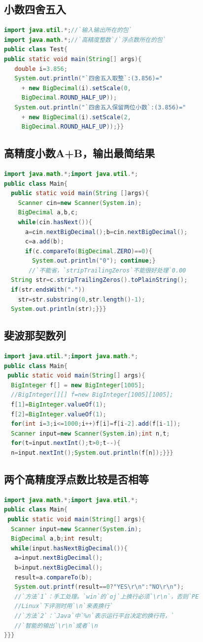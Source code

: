 \documentclass[UTF8,a4paper,titlepage]{ctexart}
\begin{document}
        \subsection{小数四舍五入}
\begin{lstlisting}[language=Java]
import java.util.*;//`输入输出所在的包`
import java.math.*;//`高精度整数`/`浮点数所在的包`
public class Test{
public static void main(String[] args){
   double i=3.856;
   System.out.println("`四舍五入取整`:(3.856)="
     + new BigDecimal(i).setScale(0,
     BigDecimal.ROUND_HALF_UP));
   System.out.println("`四舍五入保留两位小数`:(3.856)="
     + new BigDecimal(i).setScale(2,
     BigDecimal.ROUND_HALF_UP));}}
\end{lstlisting}
        \subsection{高精度小数A+B，输出最简结果}
\begin{lstlisting}[language=Java]
import java.math.*;import java.util.*;
public class Main{
  public static void main(String []args){
    Scanner cin=new Scanner(System.in);
    BigDecimal a,b,c;
    while(cin.hasNext()){
      a=cin.nextBigDecimal();b=cin.nextBigDecimal();
      c=a.add(b);
      if(c.compareTo(BigDecimal.ZERO)==0){
        System.out.println("0"); continue;}
       //`不能省，`stripTrailingZeros`不能很好处理`0.00
  String str=c.stripTrailingZeros().toPlainString();
  if(str.endsWith("."))
    str=str.substring(0,str.length()-1);
  System.out.println(str);}}}
\end{lstlisting}
        \subsection{斐波那契数列}
\begin{lstlisting}[language=Java]
import java.util.*;import java.math.*;
public class Main{
 public static void main(String[] args){
  BigInteger f[] = new BigInteger[1005];
  //BigInteger[][] f=new BigInteger[1005][1005];
  f[1]=BigInteger.valueOf(1);
  f[2]=BigInteger.valueOf(1);
  for(int i=3;i<=1000;i++)f[i]=f[i-2].add(f[i-1]);
  Scanner input=new Scanner(System.in);int n,t;
  for(t=input.nextInt();t>0;t--){
  n=input.nextInt();System.out.println(f[n]);}}}
\end{lstlisting}
     \subsection{两个高精度浮点数比较是否相等}
\begin{lstlisting}[language=Java]
import java.math.*;import java.util.*;
public class Main{
 public static void main(String[] args){
  Scanner input=new Scanner(System.in);
  BigDecimal a,b;int result;
  while(input.hasNextBigDecimal()){
   a=input.nextBigDecimal();
   b=input.nextBigDecimal();
   result=a.compareTo(b);
   System.out.printf(result==0?"YES\r\n":"NO\r\n");
   //`方法`1`：手工处理。`win`的`oj`上换行必须`\r\n`，否则`PE
   //Linux`下评测时用`\n`来表换行`
   //`方法`2`：`Java`中`%n`表示运行平台决定的换行符，`
   //`智能的输出`\r\n`或者`\n
}}}
\end{lstlisting}
\end{document}
